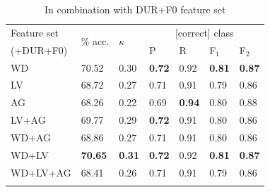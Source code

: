\documentclass[a4paper]{article}
\begin{document}
		\begin{table}[!b]
			\centering
			\caption[Results of experiments with speaker and word features]{Results of experiments with speaker and word features. %
			Best values achieved for each metric are displayed in \textbf{bold}.
			}
			
					\begin{subtable}{\columnwidth}
			\centering
			\caption{In combination with DUR+F0 feature set}
			\begin{tabularx}{\columnwidth}{lXXXXXX}		
			\toprule
			Feature set & \multirow{2}{*}{\% acc.} & \multirow{2}{*}{$\kappa$} & \multicolumn{4}{c}{[correct] class} \\
			 \cmidrule(lr){4-7}
			(+DUR+F0)& & & P & R & F$_1$ & F$_2$ \\
			\midrule
WD		&	70.52	&	0.30	&	\textbf{0.72}	&	0.92	&	\textbf{0.81}	&	\textbf{0.87}	\\
LV		&	68.72	&	0.27	&	0.71	&	0.91	&	0.79	&	0.86	\\
AG	&	68.26	&	0.22	&	0.69	&	\textbf{0.94}	&	0.80	&	0.88	\\
LV+AG	&	69.77	&	0.29	&	\textbf{0.72}	&	0.91	&	0.80	&	0.86	\\
WD+AG	&	68.86	&	0.27	&	0.71	&	0.91	&	0.80	&	0.86	\\
WD+LV	&	\textbf{70.65}	&	\textbf{0.31}	&	\textbf{0.72}	&	0.92	&	\textbf{0.81}	&	\textbf{0.87}	\\
WD+LV+AG	&	68.41	&	0.26	&	0.71	&	0.91	&	0.79	&	0.86	\\
			\bottomrule
			\label{tab:results:spkrword:durF0}
			\end{tabularx}
		\end{subtable}
			

\end{table}
\end{document}
